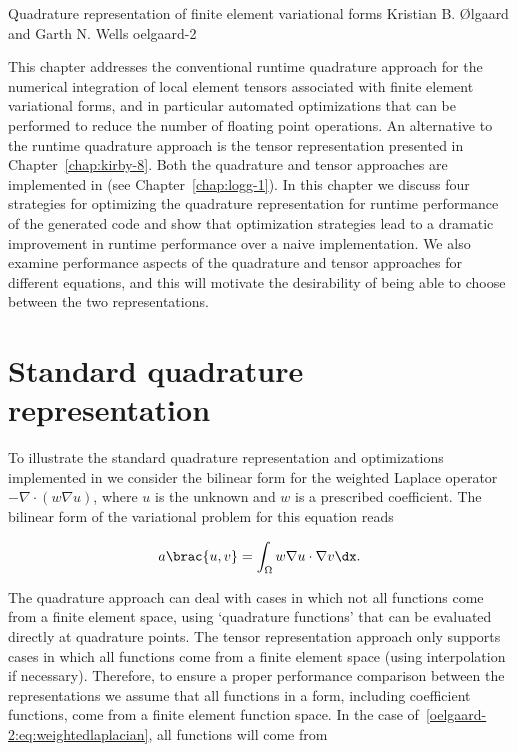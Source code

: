               {Quadrature representation of finite element variational forms}
              {Kristian B. \O{}lgaard and Garth N. Wells}
              {oelgaard-2}

This chapter addresses the conventional runtime quadrature approach
for the numerical integration of local element tensors associated with
finite element variational forms, and in particular automated
optimizations that can be performed to reduce the number of floating
point operations.  An alternative to the runtime quadrature approach
is the tensor representation presented in Chapter~\ref{chap:kirby-8}.
Both the quadrature and tensor approaches are implemented in \ffc{}
(see Chapter~\ref{chap:logg-1}).  In this chapter we discuss four
strategies for optimizing the quadrature representation for runtime
performance of the generated code and show that optimization
strategies lead to a dramatic improvement in runtime performance over
a naive implementation.  We also examine performance aspects of the
quadrature and tensor approaches for different equations, and this
will motivate the desirability of being able to choose between the two
representations.

\section{Standard quadrature representation}
\label{oelgaard-2:sec:standard_quadrature_representation}

To illustrate the standard quadrature representation  and optimizations implemented in \ffc{} we consider
the bilinear form for the weighted Laplace operator $-\nabla \cdot (w
\nabla u)$, where $u$ is the unknown and $w$ is a prescribed
coefficient.  The bilinear form of the variational problem for this
equation reads

\begin{equation}
  a\brac{u, v} = \int_{\Omega} w \nabla u \cdot \nabla v \dx.
  \label{oelgaard-2:eq:weightedlaplacian}
\end{equation}

The quadrature approach can deal with cases in which not all functions
come from a finite element space, using `quadrature functions' that
can be evaluated directly at quadrature points. The tensor
representation approach only supports cases in which all functions
come from a finite element space (using interpolation if necessary).
Therefore, to ensure a proper performance comparison between the
representations we assume that all functions in a form, including
coefficient functions, come from a finite element function space. In
the case of~\eqref{oelgaard-2:eq:weightedlaplacian}, all
functions will come from

